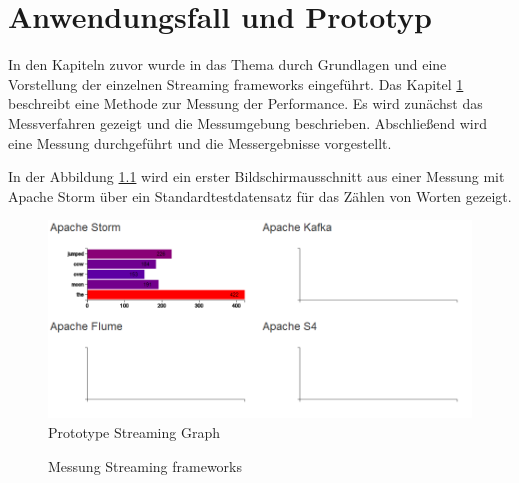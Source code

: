 \chapter{Anwendungsfall und Prototyp}
\label{chapter:prototype}

In den Kapiteln zuvor wurde in das Thema durch Grundlagen und eine Vorstellung der einzelnen Streaming frameworks eingeführt. Das Kapitel \ref{chapter:prototype} beschreibt eine Methode zur Messung der Performance. Es wird zunächst das Messverfahren gezeigt und die Messumgebung beschrieben. Abschließend wird eine Messung durchgeführt und die Messergebnisse vorgestellt.

In der Abbildung \ref{fig:prototypeStreamingGraph} wird ein erster Bildschirmausschnitt aus einer Messung mit Apache Storm über ein Standardtestdatensatz für das Zählen von Worten gezeigt.

\begin{figure}[htb!]
\centering
\includegraphics[width=1.0\textwidth]{bilder/PrototypeStreamingGraph.png}
\caption{Prototype Streaming Graph
\label{fig:prototypeStreamingGraph}}
\end{figure}

\begin{figure}

\caption{Messung Streaming frameworks
\label{fig:messung}}
      \end{figure}
